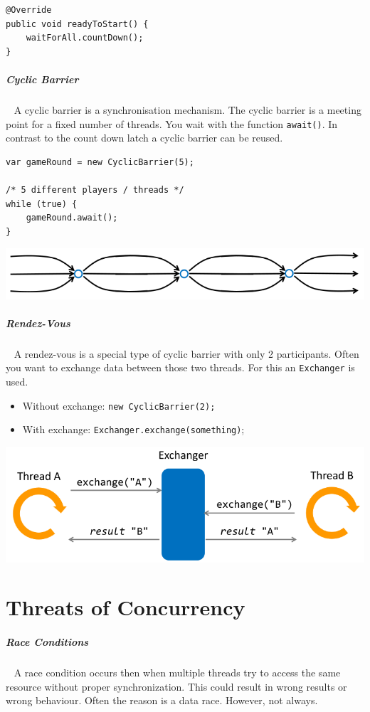 \documentclass[11pt,twoside,landscape]{article}
\begin{document}
\begin{multicols}{3}
\begin{lstlisting}
@Override
public void readyToStart() {
    waitForAll.countDown();
}
\end{lstlisting}
\subparagraph{Cyclic Barrier} \
\label{sec:org5d56cb0}
A cyclic barrier is a synchronisation mechanism.
The cyclic barrier is a meeting point for a fixed number of threads.
You wait with the function \texttt{await()}.
In contrast to the count down latch a cyclic barrier can be reused.

\lstset{language=java,label= ,caption= ,captionpos=b,numbers=none}
\begin{lstlisting}
var gameRound = new CyclicBarrier(5);

/* 5 different players / threads */
while (true) {
    gameRound.await();
}
\end{lstlisting}


{
\begin{center}
\includegraphics[width=.9\linewidth]{img/cyclic_barrier.png}
\end{center}
\label{fig:cyclic-barrier}
}
\subparagraph{Rendez-Vous} \
\label{sec:orgdadc91b}
A rendez-vous is a special type of cyclic barrier with only 2 participants.
Often you want to exchange data between those two threads.
For this an \texttt{Exchanger} is used.


\begin{itemize}
\item Without exchange: \texttt{new CyclicBarrier(2);}
\item With exchange: \texttt{Exchanger.exchange(something)};
\end{itemize}


{
\begin{center}
\includegraphics[width=.9\linewidth]{img/exchanger.png}
\end{center}
\captionof{figure}{Exchanger Workflow}\label{fig:exchanger-workflow}
}

\section{Threats of Concurrency}
\label{sec:org5abf9ad}
\subparagraph{Race Conditions} \
\label{sec:orge2e0b20}
A race condition occurs then when multiple threads try to access the same resource without proper synchronization.
This could result in wrong results or wrong behaviour.
Often the reason is a data race.
However, not always.


\end{multicols}
\end{document}
